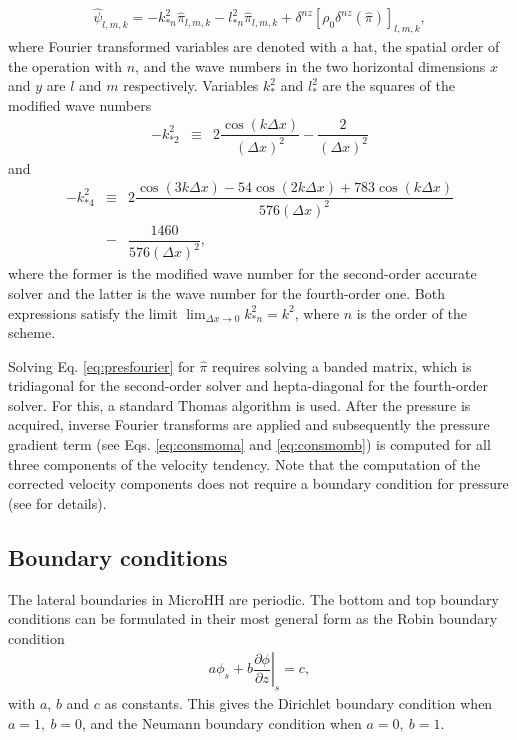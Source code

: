 \documentclass[gmd,manuscript]{copernicus}
\begin{document}
\begin{eqnarray}
\widehat{\psi}_{l,m,k} = - k^2_{*n} \widehat{\pi}_{l,m,k} - l^2_{*n} \widehat{\pi}_{l,m,k}
+ \delta^{nz} \left[ \rho_0 \delta^{nz} \left( \widehat{\pi} \right) \right]_{l,m,k},\label{eq:presfourier}
\end{eqnarray}
where Fourier transformed variables are denoted with a hat, the spatial order of the operation with $n$, and the wave numbers in the two horizontal dimensions $x$ and $y$ are $l$ and $m$ respectively. Variables $k_*^2$ and $l_*^2$ are the squares of the modified wave numbers
\begin{eqnarray}
-k_{*2}^2 & \equiv & 2 \dfrac{\cos (k \Delta x)}{\left( \Delta x \right)^2} - \dfrac{2}{\left( \Delta x \right)^2}
\end{eqnarray}
and
\begin{eqnarray}
\nonumber
-k_{*4}^2 & \equiv & 2 \dfrac{\cos (3k \Delta x) - 54 \cos (2k \Delta x) + 783 \cos (k \Delta x)}
{576 \left( \Delta x \right)^2}\\
& - & \dfrac{1460}{576 \left( \Delta x \right)^2},
\end{eqnarray}
where the former is the modified wave number for the second-order accurate solver and the latter is the wave number for the fourth-order one. Both expressions satisfy the limit
$\lim_{\Delta x \rightarrow 0} k_{*n}^2 = k^2$, where $n$ is the order of the scheme.

Solving Eq. \ref{eq:presfourier} for $\widehat{\pi}$ requires solving a banded matrix, which is tridiagonal for the second-order solver and hepta-diagonal for the fourth-order solver. For this, a standard Thomas algorithm is used. After the pressure is acquired, inverse Fourier transforms are applied and subsequently the pressure gradient term (see Eqs. \ref{eq:consmoma} and \ref{eq:consmomb}) is computed for all three components of the velocity tendency. Note that the computation of the corrected velocity components does not require a boundary condition for pressure (see \citet{Vreman2014} for details).

\subsection{Boundary conditions}
The lateral boundaries in MicroHH are periodic. The bottom and top boundary conditions can be formulated in their most general form as the Robin boundary condition
\begin{eqnarray}
a \phi_s + b \left.\dfrac{\partial \phi}{\partial z}\right|_s = c,
\end{eqnarray}
with $a$, $b$ and $c$ as constants. This gives the Dirichlet boundary condition when ${a=1,~b=0}$, and the Neumann boundary condition when ${a=0,~b=1}$. 
\end{document}
